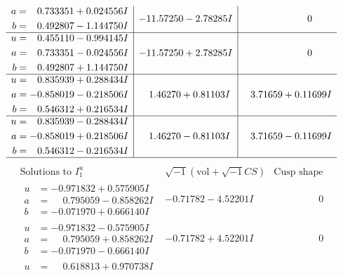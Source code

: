 \documentclass[1p]{elsarticle_modified}
\theoremstyle{definition}
\newcommand{\I}{\sqrt{-1}}
\begin{document}
$$\begin{array}{c|c|c}
\begin{aligned}
a &= \phantom{-}0.733351 + 0.024556 I \\
b &= \phantom{-}0.492807 - 1.144750 I\end{aligned}
 & -11.57250 - 2.78285 I & \phantom{-0.000000 } 0 \\ \hline\begin{aligned}
u &= \phantom{-}0.455110 - 0.994145 I \\
a &= \phantom{-}0.733351 - 0.024556 I \\
b &= \phantom{-}0.492807 + 1.144750 I\end{aligned}
 & -11.57250 + 2.78285 I & \phantom{-0.000000 } 0 \\ \hline\begin{aligned}
u &= \phantom{-}0.835939 + 0.288434 I \\
a &= -0.858019 - 0.218506 I \\
b &= \phantom{-}0.546312 + 0.216534 I\end{aligned}
 & \phantom{-}1.46270 + 0.81103 I & \phantom{-}3.71659 + 0.11699 I \\ \hline\begin{aligned}
u &= \phantom{-}0.835939 - 0.288434 I \\
a &= -0.858019 + 0.218506 I \\
b &= \phantom{-}0.546312 - 0.216534 I\end{aligned}
 & \phantom{-}1.46270 - 0.81103 I & \phantom{-}3.71659 - 0.11699 I\\
 \hline 
 \end{array}$$\newpage$$\begin{array}{c|c|c}  
\text{Solutions to }I^u_{1}& \I (\text{vol} + \sqrt{-1}CS) & \text{Cusp shape}\\
 \hline 
\begin{aligned}
u &= -0.971832 + 0.575905 I \\
a &= \phantom{-}0.795059 - 0.858262 I \\
b &= -0.071970 + 0.666140 I\end{aligned}
 & -0.71782 - 4.52201 I & \phantom{-0.000000 } 0 \\ \hline\begin{aligned}
u &= -0.971832 - 0.575905 I \\
a &= \phantom{-}0.795059 + 0.858262 I \\
b &= -0.071970 - 0.666140 I\end{aligned}
 & -0.71782 + 4.52201 I & \phantom{-0.000000 } 0 \\ \hline\begin{aligned}
u &= \phantom{-}0.618813 + 0.970738 I \\

\end{aligned}
\end{array}$$
\end{document}
